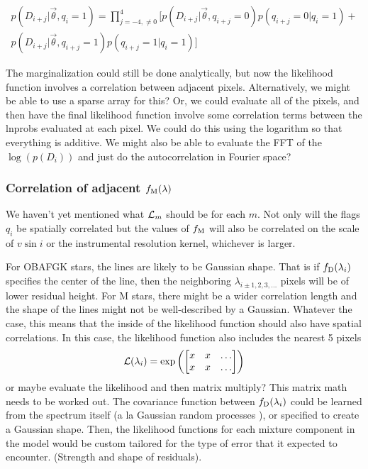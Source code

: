 \documentclass[preprint]{aastex} %
\newcommand{\vt}{\vec{\theta}}
\newcommand{\fM}{f_{\rm M}}
\newcommand{\fD}{f_{\rm D}}
\begin{document}
\begin{multline}
  p(D_{i + j} | \vt, q_i = 1) = \prod_{j = -4, \ne 0}^4 \bigl [ p(D_{i+j} | \vt, q_{i +j}=0) p(q_{i+j} = 0 | q_i=1) + \\
    p(D_{i + j} | \vt, q_{i + j} = 1) p(q_{i +j} = 1 | q_i = 1) \bigr ]
\end{multline}

The marginalization could still be done analytically, but now the likelihood function involves a correlation between adjacent pixels. Alternatively, we might be able to use a sparse array for this? Or, we could evaluate all of the pixels, and then have the final likelihood function involve some correlation terms between the lnprobs evaluated at each pixel. We could do this using the logarithm so that everything is additive. We might also be able to evaluate the FFT of the $\log(p(D_i))$ and just do the autocorrelation in Fourier space?

\subsubsection{Correlation of adjacent $\fM(\lambda)$}
We haven't yet mentioned what ${\cal L}_m$ should be for each $m$. Not only will the flags $q_i$ be spatially correlated but the values of $\fM$ will also be correlated on the scale of $v \sin i$ or the instrumental resolution kernel, whichever is larger.

For OBAFGK stars, the lines are likely to be Gaussian shape. That is if $\fD(\lambda_i)$ specifies the center of the line, then the neighboring $\lambda_{i \pm 1,2,3,\ldots}$ pixels will be of lower residual height. For M stars, there might be a wider correlation length and the shape of the lines might not be well-described by a Gaussian. Whatever the case, this means that the inside of the likelihood function should also have spatial correlations. In this case, the likelihood function also includes the nearest 5 pixels
\begin{equation}
  {\cal L}(\lambda_i) = \exp\left ( 
  \begin{bmatrix}
x & x & \dots\\
x & x & \dots\\
  \end{bmatrix}
  \right )
\end{equation}
or maybe evaluate the likelihood and then matrix multiply? This matrix math needs to be worked out. The covariance function between $\fD(\lambda_i)$ could be learned from the spectrum itself (a la Gaussian random processes \citep{rw05}), or specified to create a Gaussian shape. Then, the likelihood functions for each mixture component in the model would be custom tailored for the type of error that it expected to encounter. (Strength and shape of residuals).
\end{document}
